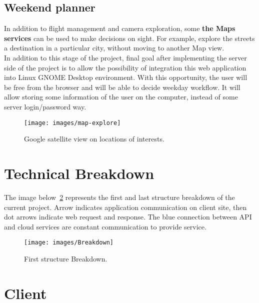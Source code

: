 \documentclass[12pt]{article}
\numberwithin{equation}{section} %
\numberwithin{figure}{section} %
\numberwithin{table}{section} %
\begin{document}
	\subsection{Weekend planner}
		In addition to flight management and camera exploration, some \textbf{the Maps services} can be used to make decisions on sight. For example, explore the streets a destination in a particular city, without moving to another Map view. \\
		In addition to this stage of the project, final goal after implementing the server side of the project is to allow the possibility of integration this web application into Linux GNOME Desktop environment. With this opportunity, the user will be free from the browser and will be able to decide weekday workflow. It will allow storing some information of the user on the computer, instead of some server login/password way.
		\begin{figure}[H]
			\centering        
			\texttt{[image: images/map-explore]}
			\caption{Google satellite view on locations of interests.}
			\label{fig:map-satel}
		\end{figure}	
		
\section{Technical Breakdown}	
	The image below~\ref{fig:break} represents the first and last structure breakdown of the current project. Arrow indicates application communication on client site, then dot arrows indicate web request and response. The blue connection between API and cloud services are constant communication to provide service.
	\begin{figure}[H]
		\centering		
		\texttt{[image: images/Breakdown]}
		\caption{First structure Breakdown.}
		\label{fig:break}
	\end{figure}
	
		
\newpage
\section{Client}
	
\end{document}
